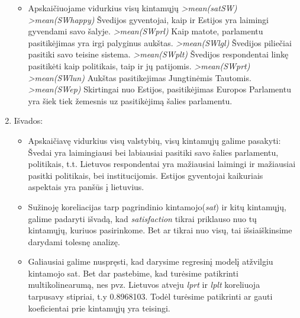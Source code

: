 \documentclass[a4paper]{article}
\begin{document}
\begin{enumerate}
\begin{itemize}
\item Apskaičiuojame vidurkius visų kintamųjų
\newline \textit{ >mean(satSW) 
   }
\newline \textit{ >mean(SWhappy) 
   }
\newline Švedijos gyventojai, kaip ir Estijos yra laimingi gyvendami savo šalyje.
\newline \textit{ >mean(SWprl) 
   }
\newline Kaip matote, parlamentu pasitikėjimas yra irgi palyginus aukštas.
\newline \textit{ >mean(SWlgl) 
   }
\newline Švedijos piliečiai pasitiki savo teisine sistema.
\newline \textit{ >mean(SWplt) 
   }
\newline Švedijos respondentai linkę pasitikėti kaip politikais, taip ir jų patijomis.
\newline \textit{ >mean(SWprt) 
   }
\newline \textit{ >mean(SWlun) 
   }
\newline Aukštas pasitikejimas Jungtinėmis Tautomis.
\newline \textit{ >mean(SWep) 
  }
\newline Skirtingai nuo Estijos, pasitikėjimas Europos Parlamentu yra šiek tiek žemesnis uz pasitikėjimą šalies parlamentu.




\end{itemize}
 \item Išvados:
\begin{itemize}
\item Apskaičiavę vidurkius visų valstybių, visų kintamųjų galime pasakyti:
\newline  Švedai yra laimingiausi bei labiausiai pasitiki savo šalies parlamentu, politikais, t.t. Lietuvos respondentai yra mažiausiai laimingi ir mažiausiai pasitki politikais, bei institucijomis. Estijos gyventojai  kaikuriais aspektais yra panšūs į lietuvius.
\item Sužinoję koreliacijas tarp pagrindinio kintamojo(\textit{sat}) ir kitų kintamųjų, galime padaryti išvadą, kad \textit{satisfaction} tikrai priklauso nuo tų kintamųjų, kuriuos pasirinkome. Bet ar tikrai nuo visų, tai išsiaiškinsime darydami tolesnę analizę. 
\item Galiausiai galime nuspręsti, kad darysime regresinį modelį atžvilgiu kintamojo sat. Bet dar pastebime, kad turėsime patikrinti multikolinearumą, nes pvz. Lietuvos atveju \textit{lprt} ir \textit{lplt} koreliuoja tarpusavy stipriai, t.y 0.8968103. Todėl turėsime patikrinti ar gauti koeficientai prie kintamųjų yra teisingi.


\end{itemize}
\end{enumerate}
\end{document}
